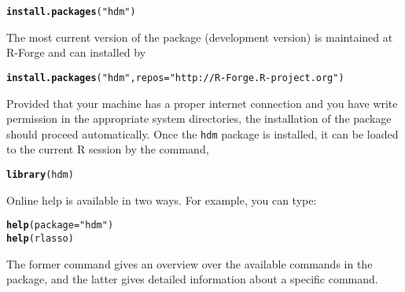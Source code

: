 \documentclass{amsart}\usepackage[]{graphicx}\usepackage[]{color}
\makeatletter
\newcommand{\hlstr}[1]{\textcolor[rgb]{0.192,0.494,0.8}{#1}}%
\newcommand{\hlstd}[1]{\textcolor[rgb]{0.345,0.345,0.345}{#1}}%
\newcommand{\hlkwc}[1]{\textcolor[rgb]{0.333,0.667,0.333}{#1}}%
\newcommand{\hlkwd}[1]{\textcolor[rgb]{0.737,0.353,0.396}{\textbf{#1}}}%
\newenvironment{kframe}{%
 \def\at@end@of@kframe{}%
 \ifinner\ifhmode%
  \def\at@end@of@kframe{\end{minipage}}%
  \begin{minipage}{\columnwidth}%
 \fi\fi%
 \def\FrameCommand##1{\hskip\@totalleftmargin \hskip-\fboxsep
 \colorbox{shadecolor}{##1}\hskip-\fboxsep
     \hskip-\linewidth \hskip-\@totalleftmargin \hskip\columnwidth}%
 \MakeFramed {\advance\hsize-\width
   \@totalleftmargin\z@ \linewidth\hsize
   \@setminipage}}%
 {\par\unskip\endMakeFramed%
 \at@end@of@kframe}
\newenvironment{knitrout}{}{} %
\newcommand{\R}{{\normalfont\textsf{R }}{}}
\makeatother
\begin{document}
\begin{knitrout}
\color{fgcolor}\begin{kframe}
\begin{alltt}
\hlkwd{install.packages}\hlstd{(}\hlstr{"hdm"}\hlstd{)}
\end{alltt}
\end{kframe}
\end{knitrout}

\noindent
The most current version of the package (development version) is maintained at R-Forge and can installed by

\begin{knitrout}
\color{fgcolor}\begin{kframe}
\begin{alltt}
\hlkwd{install.packages}\hlstd{(}\hlstr{"hdm"}\hlstd{,} \hlkwc{repos}\hlstd{=}\hlstr{"http://R-Forge.R-project.org"}\hlstd{)}
\end{alltt}
\end{kframe}
\end{knitrout}


\noindent
Provided that your machine has a proper internet connection and you
have write permission in the appropriate system directories,
the installation of the package should proceed automatically.
Once the \texttt{hdm} package is installed, it can be loaded to the current \R session by the command,
\begin{knitrout}
\color{fgcolor}\begin{kframe}
\begin{alltt}
\hlkwd{library}\hlstd{(hdm)}
\end{alltt}
\end{kframe}
\end{knitrout}


Online help is available in two ways.  For example, 
you  can type:
\begin{knitrout}
\color{fgcolor}\begin{kframe}
\begin{alltt}
\hlkwd{help}\hlstd{(}\hlkwc{package}\hlstd{=}\hlstr{"hdm"}\hlstd{)}
\hlkwd{help}\hlstd{(rlasso)}
\end{alltt}
\end{kframe}
\end{knitrout}
The former command gives an overview over the available commands in the package, and
the latter gives detailed information about a specific command.
\end{document}
